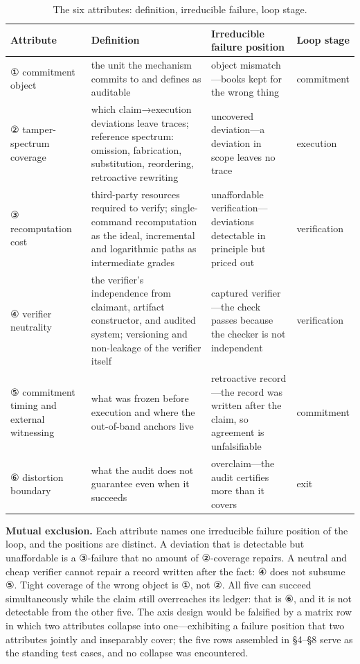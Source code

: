 \documentclass[11pt,a4paper]{article}
\begin{document}
\begin{table}[htbp]
\centering
\footnotesize
\setlength{\tabcolsep}{3.5pt}
\renewcommand{\arraystretch}{1.18}
\begin{tabularx}{0.985\textwidth}{>{\raggedright\arraybackslash}p{} >{\raggedright\arraybackslash}X >{\raggedright\arraybackslash}p{} >{\raggedright\arraybackslash}p{}}
\toprule
\textbf{Attribute} & \textbf{Definition} & \textbf{Irreducible failure position} & \textbf{Loop stage} \\
\midrule
① commitment object & the unit the mechanism commits to and defines as auditable & object mismatch—books kept for the wrong thing & commitment \\
② tamper-spectrum coverage & which claim→execution deviations leave traces; reference spectrum: omission, fabrication, substitution, reordering, retroactive rewriting & uncovered deviation—a deviation in scope leaves no trace & execution \\
③ recomputation cost & third-party resources required to verify; single-command recomputation as the ideal, incremental and logarithmic paths as intermediate grades & unaffordable verification—deviations detectable in principle but priced out & verification \\
④ verifier neutrality & the verifier's independence from claimant, artifact constructor, and audited system; versioning and non-leakage of the verifier itself & captured verifier—the check passes because the checker is not independent & verification \\
⑤ commitment timing and external witnessing & what was frozen before execution and where the out-of-band anchors live & retroactive record—the record was written after the claim, so agreement is unfalsifiable & commitment \\
⑥ distortion boundary & what the audit does not guarantee even when it succeeds & overclaim—the audit certifies more than it covers & exit \\
\bottomrule
\end{tabularx}
\caption{The six attributes: definition, irreducible failure, loop stage.}
\label{tab:T2}
\end{table}

\textbf{Mutual exclusion.} Each attribute names one irreducible failure position of the loop, and the positions are distinct. A deviation that is detectable but unaffordable is a ③-failure that no amount of ②-coverage repairs. A neutral and cheap verifier cannot repair a record written after the fact: ④ does not subsume ⑤. Tight coverage of the wrong object is ①, not ②. All five can succeed simultaneously while the claim still overreaches its ledger: that is ⑥, and it is not detectable from the other five. The axis design would be falsified by a matrix row in which two attributes collapse into one—exhibiting a failure position that two attributes jointly and inseparably cover; the five rows assembled in §4–§8 serve as the standing test cases, and no collapse was encountered.
\end{document}
